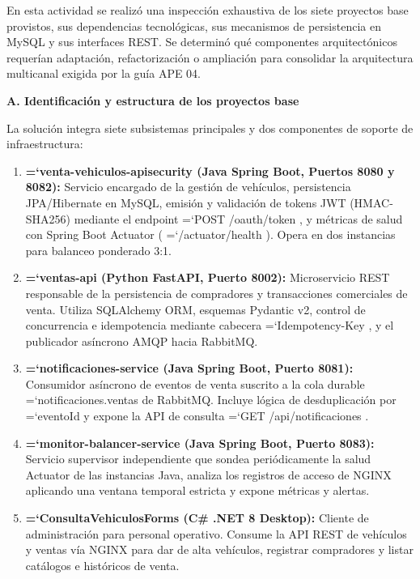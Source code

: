 \documentclass[11pt,a4paper]{article}
\renewcommand{\_}{\oldunderscore\allowbreak}
\DeclareRobustCommand{\texttt}[1]{%
  {\upshape\ttfamily\fontsize{9}{10.8}\selectfont\hyphenchar\font=`\-\relax #1}%
}
\begin{document}
\vspace{0.2cm}
\noindent En esta actividad se realizó una inspección exhaustiva de los siete proyectos base provistos, sus dependencias tecnológicas, sus mecanismos de persistencia en MySQL y sus interfaces REST. Se determinó qué componentes arquitectónicos requerían adaptación, refactorización o ampliación para consolidar la arquitectura multicanal exigida por la guía APE 04.

\vspace{0.2cm}
\noindent\textbf{A. Identificación y estructura de los proyectos base}

\noindent La solución integra siete subsistemas principales y dos componentes de soporte de infraestructura:
\begin{enumerate}[leftmargin=*,itemsep=2pt,topsep=2pt]
  \item \textbf{\texttt{venta-vehiculos-api\_security} (Java Spring Boot, Puertos 8080 y 8082):} Servicio encargado de la gestión de vehículos, persistencia JPA/Hibernate en MySQL, emisión y validación de tokens JWT (HMAC-SHA256) mediante el endpoint \texttt{POST /\allowbreak{}oauth/\allowbreak{}token}, y métricas de salud con Spring Boot Actuator (\texttt{/\allowbreak{}actuator/\allowbreak{}health}). Opera en dos instancias para balanceo ponderado 3:1.
  \item \textbf{\texttt{ventas-api} (Python FastAPI, Puerto 8002):} Microservicio REST responsable de la persistencia de compradores y transacciones comerciales de venta. Utiliza SQLAlchemy ORM, esquemas Pydantic v2, control de concurrencia e idempotencia mediante cabecera \texttt{Idempotency-Key}, y el publicador asíncrono AMQP hacia RabbitMQ.
  \item \textbf{\texttt{notificaciones-service} (Java Spring Boot, Puerto 8081):} Consumidor asíncrono de eventos de venta suscrito a la cola durable \texttt{notificaciones.\allowbreak{}ventas} de RabbitMQ. Incluye lógica de desduplicación por \texttt{eventoId} y expone la API de consulta \texttt{GET /\allowbreak{}api/\allowbreak{}notificaciones}.
  \item \textbf{\texttt{monitor-balancer-service} (Java Spring Boot, Puerto 8083):} Servicio supervisor independiente que sondea periódicamente la salud Actuator de las instancias Java, analiza los registros de acceso de NGINX aplicando una ventana temporal estricta y expone métricas y alertas.
  \item \textbf{\texttt{ConsultaVehiculosForms} (C\# .NET 8 Desktop):} Cliente de administración para personal operativo. Consume la API REST de vehículos y ventas vía NGINX para dar de alta vehículos, registrar compradores y listar catálogos e históricos de venta.

\end{enumerate}
\end{document}
